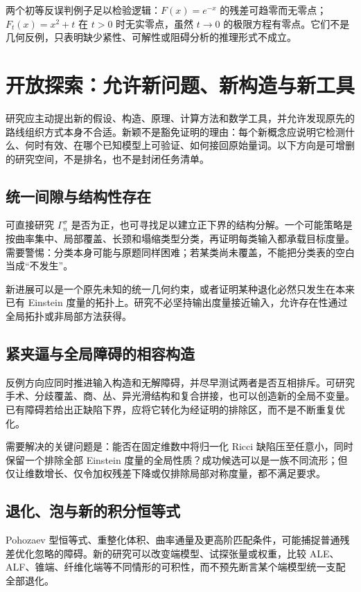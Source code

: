 \documentclass[11pt,a4paper]{article}
\theoremstyle{definition}
\begin{document}
两个初等反误判例子足以检验逻辑：$F(x)=e^{-x}$ 的残差可趋零而无零点；$F_t(x)=x^2+t$ 在 $t>0$ 时无实零点，虽然 $t\to0$ 的极限方程有零点。它们不是几何反例，只表明缺少紧性、可解性或阻碍分析的推理形式不成立。

\section{开放探索：允许新问题、新构造与新工具}\label{sec:exploration}

研究应主动提出新的假设、构造、原理、计算方法和数学工具，并允许发现原先的路线组织方式本身不合适。新颖不是豁免证明的理由：每个新概念应说明它检测什么、何时有效、在哪个已知模型上可验证、如何接回原始量词。以下方向是可增删的研究空间，不是排名，也不是封闭任务清单。

\subsection{统一间隙与结构性存在}

可直接研究 $\Gamma_n^\sigma$ 是否为正，也可寻找足以建立正下界的结构分解。一个可能策略是按曲率集中、局部覆盖、长颈和塌缩类型分类，再证明每类输入都承载目标度量。需要警惕：分类本身可能与原题同样困难；若某类尚未覆盖，不能把分类表的空白当成“不发生”。

新进展可以是一个原先未知的统一几何约束，或者证明某种退化必然只发生在本来已有 Einstein 度量的拓扑上。研究不必坚持输出度量接近输入，允许存在性通过全局拓扑或非局部方法获得。

\subsection{紧夹逼与全局障碍的相容构造}

反例方向应同时推进输入构造和无解障碍，并尽早测试两者是否互相排斥。可研究手术、分歧覆盖、商、丛、异光滑结构和复合拼接，也可以创造新的全局不变量。已有障碍若给出正缺陷下界，应将它转化为经证明的排除区，而不是不断重复优化。

需要解决的关键问题是：能否在固定维数中将归一化 Ricci 缺陷压至任意小，同时保留一个排除全部 Einstein 度量的全局性质？成功候选可以是一族不同流形；但仅让维数增长、仅令加权残差下降或仅排除局部对称度量，都不满足要求。

\subsection{退化、泡与新的积分恒等式}

Pohozaev 型恒等式、重整化体积、曲率通量及更高阶匹配条件，可能捕捉普通残差优化忽略的障碍。新的研究可以改变端模型、试探张量或权重，比较 ALE、ALF、锥端、纤维化端等不同情形的可积性，而不预先断言某个端模型统一支配全部退化。
\end{document}
